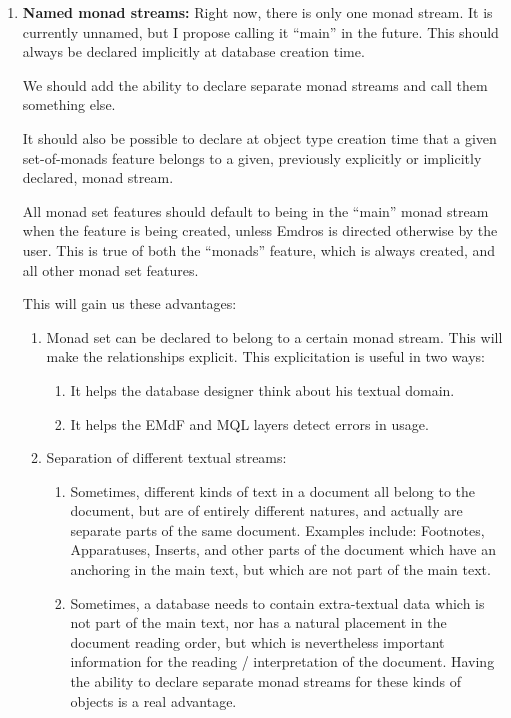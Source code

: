 \documentclass[a4paper,12pt]{article}
\begin{document}
\begin{enumerate}
\item \textbf{Named monad streams:} Right now, there is only one monad
  stream.  It is currently unnamed, but I propose calling it ``main''
  in the future.  This should always be declared implicitly at
  database creation time.

  We should add the ability to declare separate monad streams and call
  them something else.

  It should also be possible to declare at object type creation time
  that a given set-of-monads feature belongs to a given, previously
  explicitly or implicitly declared, monad stream.

  All monad set features should default to being in the ``main'' monad
  stream when the feature is being created, unless Emdros is directed
  otherwise by the user.  This is true of both the ``monads'' feature,
  which is always created, and all other monad set features.
  
  This will gain us these advantages:
  \begin{enumerate}
  \item Monad set can be declared to belong to a certain monad stream.
    This will make the relationships explicit.  This explicitation is
    useful in two ways:
    \begin{enumerate}
      \item It helps the database designer think about his textual
        domain.
      \item It helps the EMdF and MQL layers detect errors in usage.
    \end{enumerate}

  \item Separation of different textual streams:

    \begin{enumerate}
    \item Sometimes, different kinds of text in a document all belong
      to the document, but are of entirely different natures, and
      actually are separate parts of the same document.  Examples
      include: Footnotes, Apparatuses, Inserts, and other parts of the
      document which have an anchoring in the main text, but which are
      not part of the main text.
    \item Sometimes, a database needs to contain extra-textual data
      which is not part of the main text, nor has a natural placement
      in the document reading order, but which is nevertheless
      important information for the reading / interpretation of the
      document.  Having the ability to declare separate monad streams
      for these kinds of objects is a real advantage.
    \end{enumerate}
  \end{enumerate}


\end{enumerate}
\end{document}
